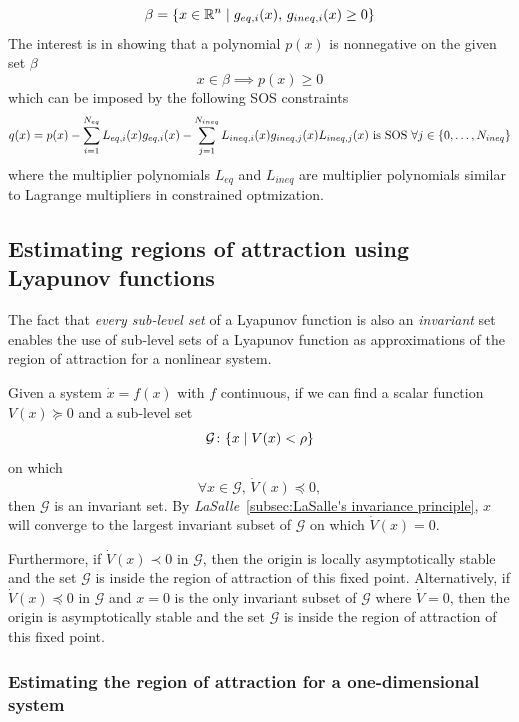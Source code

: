 \[
  \beta = \lbrace x \in \mathbb{R}^n \mid g_{eq,i}(x),\,g_{ineq,i}(x) \geq 0\rbrace
\]
The interest is in showing that a polynomial \(p(x)\) is nonnegative on the
given set \(\beta\)
\[
  x \in \beta \implies p(x) \geq 0
\]
which can be imposed by the following SOS constraints
\[
  q(x) = p(x) - \sum_{i=1}^{N_{eq}}L_{eq,i}(x)g_{eq,i}(x) -
  \sum_{j=1}^{N_{ineq}}L_{ineq,i}(x)g_{ineq,j}(x) \\
  L_{ineq,j}(x) \text{ is SOS } \forall j \in \lbrace0,\ldots,N_{ineq}\rbrace
\]
where the multiplier polynomials \(L_{eq}\) and \(L_{ineq}\) are multiplier
polynomials similar to Lagrange multipliers in constrained optmization.

\subsection{Estimating regions of attraction using Lyapunov functions}

The fact that \textit{every sub-level set} of a Lyapunov function is also an
\textit{invariant} set enables the use of sub-level sets of a Lyapunov function
as approximations of the region of attraction for a nonlinear system.

\begin{theorem}
  Given a system \(\dot{x} = f(x)\) with \(f\) continuous, if we can find a
  scalar function \(V(x) \succeq 0 \) and a sub-level set
  \[
    \mathcal{G} \colon \lbrace x \mid V(x) < \rho\rbrace
  \]
  on which
  \[
    \forall x \in \mathcal{G},\,\dot{V}(x) \preceq 0,
  \]
  then \(\mathcal{G}\) is an invariant set. By
  \textit{LaSalle}~\ref{subsec:LaSalle's invariance principle}, \(x\) will
  converge to the largest invariant subset of \(\mathcal{G}\) on which
  \(\dot{V}(x) = 0\).

  Furthermore, if \(\dot{V}(x) \prec 0\) in \(\mathcal{G}\), then the origin is
  locally asymptotically stable and the set \(\mathcal{G}\) is inside the region
  of attraction of this fixed point. Alternatively, if \(\dot{V}(x) \preceq 0 \)
  in \(\mathcal{G}\) and \(x = 0\) is the only invariant subset of
  \(\mathcal{G}\) where \(\dot{V} = 0\), then the origin is asymptotically
  stable and the set \(\mathcal{G}\) is inside the region of attraction of this
  fixed point.
\end{theorem}
\cite{tedrakeUnderactuatedRoboticsAlgorithms2019}

\subsubsection{Estimating the region of attraction for a one-dimensional system}
\label{subsec:Estimating the region of attraction for a one-dimensional system}

